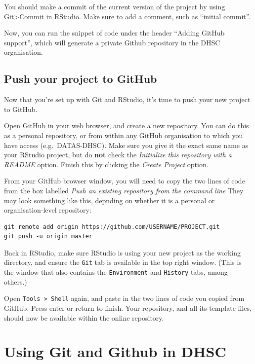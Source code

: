 \documentclass[
  letterpaper,
]{book}
\begin{document}
\begin{tcolorbox}
You should make a commit of the current version of the project by using
Git\textgreater Commit in RStudio. Make sure to add a comment, such as
``initial commit''.

Now, you can run the snippet of code under the header ``Adding GitHub
support'', which will generate a private Github repository in the DHSC
organisation.

\hypertarget{push-your-project-to-github}{%
\subsection{Push your project to
GitHub}\label{push-your-project-to-github}}

Now that you're set up with Git and RStudio, it's time to push your new
project to GitHub.

Open GitHub in your web browser, and create a new repository. You can do
this as a personal repository, or from within any GitHub organisation to
which you have access (e.g.~DATAS-DHSC). Make sure you give it the exact
same name as your RStudio project, but do \textbf{not} check the
\emph{Initialize this repository with a README} option. Finish this by
clicking the \emph{Create Project} option.

From your GitHub browser window, you will need to copy the two lines of
code from the box labelled \emph{Push an existing repository from the
command line} They may look something like this, depnding on whether it
is a personal or organisation-level repository:

\begin{verbatim}
git remote add origin https://github.com/USERNAME/PROJECT.git
git push -u origin master
\end{verbatim}

Back in RStudio, make sure RStudio is using your new project as the
working directory, and ensure the \texttt{Git} tab is available in the
top right window. (This is the window that also contains the
\texttt{Environment} and \texttt{History} tabs, among others.)

Open \texttt{Tools\ \textgreater{}\ Shell} again, and paste in the two
lines of code you copied from GitHub. Press enter or return to finish.
Your repository, and all its template files, should now be available
within the online repository.

\end{tcolorbox}

\hypertarget{using-git-and-github-in-dhsc}{%
\section{Using Git and Github in
DHSC}\label{using-git-and-github-in-dhsc}}
\end{document}
